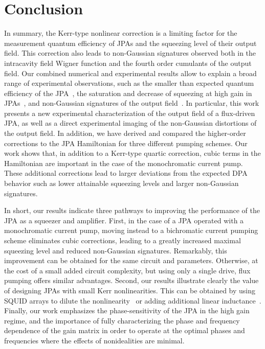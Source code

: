 \documentclass[pra,twocolumn,superscriptaddress]{revtex4-1}
\begin{document}
\section{Conclusion}
\label{sec::conclusion}
In summary, the Kerr-type nonlinear correction is a limiting factor for the measurement quantum efficiency of JPAs and the squeezing level of their output field. This correction also leads to non-Gaussian signatures observed both in the intracavity field Wigner function and the fourth order cumulants of the output field.
% 
Our combined numerical and experimental results allow to explain a broad range of experimental observations, such as the smaller than expected quantum efficiency of the JPA~\cite{Murch:2013uq,Murch:2013kx,Vijay:2012uq,weberThesis},
the saturation and decrease of squeezing at high gain in JPAs~\cite{Zhong:2013vn,Murch:2013kx,Mallet:2011fk,Castellanos-Beltran:2008vn},  and non-Gaussian signatures of the output field~\cite{Zhong:2013vn,Mallet:2011fk}. 
In particular, this work presents a new experimental characterization of the output field of a flux-driven JPA, as well as a direct experimental imaging of the non-Gaussian distortions of the output field.
In addition, we have derived and compared the higher-order corrections to the JPA Hamiltonian for three different pumping schemes. 
Our work shows that, in addition to a Kerr-type quartic correction, cubic terms in the Hamiltonian are important in the case of the monochromatic current pump. These additional corrections lead to larger deviations from the expected DPA behavior such as lower attainable squeezing levels and larger non-Gaussian signatures. 

In short, our results indicate three pathways to improving the performance of the JPA as a squeezer and amplifier. 
First, in the case of a JPA operated with a monochromatic current pump,
moving instead to a bichromatic current pumping scheme eliminates cubic corrections, leading to a greatly increased maximal squeezing level and reduced non-Gaussian signatures. Remarkably, this improvement can be obtained for the same circuit and parameters. Otherwise, at the cost of a small added circuit complexity, but using  only a single drive, flux pumping offers similar advantages. 
Second, our results illustrate clearly the value of designing JPAs with small Kerr nonlinearities. This can be obtained by using SQUID arrays to dilute the nonlinearity~\cite{Castellanos-Beltran:2007ys,Eichler:2013fk} or adding additional linear inductance~\cite{Zhou:2014fk}. Finally, our work emphasizes the phase-sensitivity of the JPA in the high gain regime, and the importance of fully characterizing the phase and frequency dependence of the gain matrix in order to operate at the optimal phases and frequencies where the effects of nonidealities  are minimal.
\end{document}
